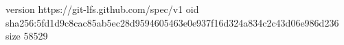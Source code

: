 version https://git-lfs.github.com/spec/v1
oid sha256:5fd1d9c8cac85ab5ec28d9594605463e0e937f16d324a834c2c43d06e986d236
size 58529
